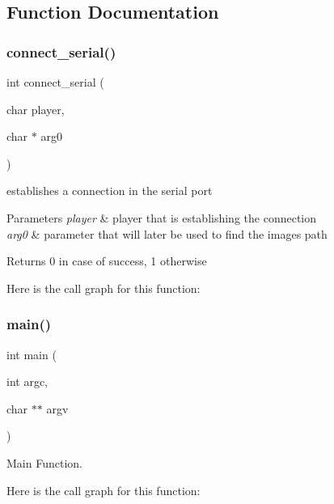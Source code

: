 \subsection{Function Documentation}
\hypertarget{group__proj_gac4a55a52afabd10db600de603282ff99}{}\label{group__proj_gac4a55a52afabd10db600de603282ff99} 
\subsubsection{\texorpdfstring{connect\+\_\+serial()}{connect\_serial()}}
{\footnotesize\ttfamily int connect\+\_\+serial (\begin{DoxyParamCaption}\item[{char}]{player,  }\item[{char $\ast$}]{arg0 }\end{DoxyParamCaption})}



establishes a connection in the serial port 


\begin{DoxyParams}{Parameters}
{\em player} & player that is establishing the connection \\
\hline
{\em arg0} & parameter that will later be used to find the images path \\
\hline
\end{DoxyParams}
\begin{DoxyReturn}{Returns}
0 in case of success, 1 otherwise 
\end{DoxyReturn}
Here is the call graph for this function\+:
\hypertarget{group__proj_ga3c04138a5bfe5d72780bb7e82a18e627}{}\label{group__proj_ga3c04138a5bfe5d72780bb7e82a18e627} 
\subsubsection{\texorpdfstring{main()}{main()}}
{\footnotesize\ttfamily int main (\begin{DoxyParamCaption}\item[{int}]{argc,  }\item[{char $\ast$$\ast$}]{argv }\end{DoxyParamCaption})}



Main Function. 

Here is the call graph for this function\+:
\hypertarget{group__proj_ga7721a8566abc323f59672fdde30d3e20}{}\label{group__proj_ga7721a8566abc323f59672fdde30d3e20} 
